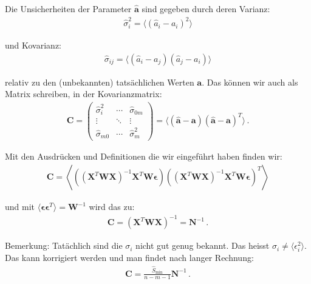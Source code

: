 Die Unsicherheiten der Parameter $\boldsymbol{\hat{a}}$ sind gegeben durch deren Varianz:
\begin{align}
\hat{\sigma}_i^2 = \langle ( \hat{a}_i - a_i )^2 \rangle
\label{eq:vl8-39}
\end{align}

und Kovarianz:
\begin{align}
\hat{\sigma}_{ij} = \langle ( \hat{a}_i - a_j ) ( \hat{a}_j - a_i ) \rangle
\label{eq:vl8-40}
\end{align}

relativ zu den (unbekannten) tats\"achlichen Werten $\boldsymbol{a}$. Das k\"onnen wir auch als Matrix schreiben, in der Kovarianzmatrix:
\begin{align}
\boldsymbol{C} = 
\begin{pmatrix}
\hat{\sigma}_i^2  & \cdots & \hat{\sigma}_{0m} \\
\vdots            & \ddots & \vdots            \\
\hat{\sigma}_{m0} & \cdots & \hat{\sigma}_m^2  
\end{pmatrix}
= \langle ( \boldsymbol{\hat{a}} - \boldsymbol{a} )( \boldsymbol{\hat{a}} - \boldsymbol{a} )^T \rangle \,.
\label{eq:vl8-41}
\end{align}

Mit den Ausdr\"ucken und Definitionen die wir eingef\"uhrt haben finden wir:
\begin{align}
\boldsymbol{C} = \left\langle \left( ( \boldsymbol{X}^T \boldsymbol{WX} )^{-1} \boldsymbol{X}^T \boldsymbol{W \epsilon} \right) \left( ( \boldsymbol{X}^T \boldsymbol{WX} )^{-1} \boldsymbol{X}^T \boldsymbol{W \epsilon} \right)^T \right\rangle 
\label{eq:vl8-42}
\end{align}

und mit $\langle \boldsymbol{ \epsilon \epsilon}^T \rangle  = \boldsymbol{W}^{-1} $ wird das zu:
\begin{align}
\boldsymbol{C} = ( \boldsymbol{X}^T \boldsymbol{WX} )^{-1} = \boldsymbol{N}^{-1}\,.
\label{eq:vl8-43}
\end{align}

Bemerkung: Tat\"achlich sind die $\sigma_i$ nicht gut genug bekannt. Das heisst $\sigma_i \neq \langle \epsilon_i^2 \rangle$. Das kann korrigiert werden und man findet nach langer Rechnung:
\begin{align}
\boldsymbol{C} = \frac{ \hat{S}_\text{min} }{ n - m -1 } \boldsymbol{N}^{-1}\,.
\label{eq:vl8-44}
\end{align}

